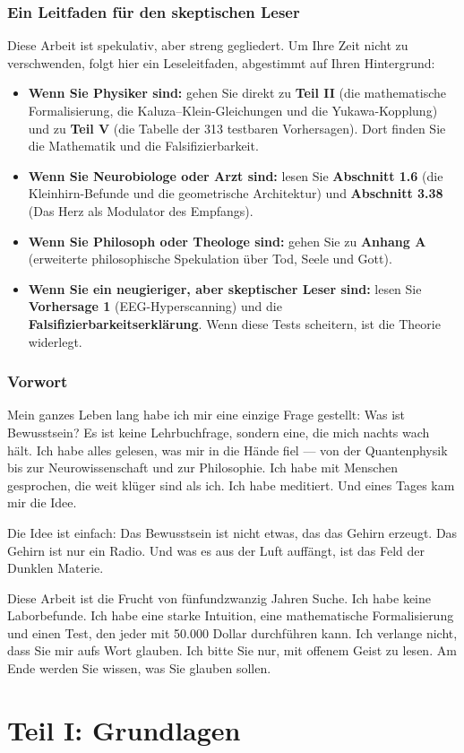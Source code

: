 \documentclass[11pt,a4paper]{article}
\begin{document}
\section*{Ein Leitfaden für den skeptischen Leser}
Diese Arbeit ist spekulativ, aber streng gegliedert. Um Ihre Zeit nicht zu verschwenden, folgt hier ein Leseleitfaden, abgestimmt auf Ihren Hintergrund:
\begin{itemize}
    \item \textbf{Wenn Sie Physiker sind:} gehen Sie direkt zu \textbf{Teil II} (die mathematische Formalisierung, die Kaluza--Klein-Gleichungen und die Yukawa-Kopplung) und zu \textbf{Teil V} (die Tabelle der 313 testbaren Vorhersagen). Dort finden Sie die Mathematik und die Falsifizierbarkeit.
    \item \textbf{Wenn Sie Neurobiologe oder Arzt sind:} lesen Sie \textbf{Abschnitt 1.6} (die Kleinhirn-Befunde und die geometrische Architektur) und \textbf{Abschnitt 3.38} (Das Herz als Modulator des Empfangs).
    \item \textbf{Wenn Sie Philosoph oder Theologe sind:} gehen Sie zu \textbf{Anhang A} (erweiterte philosophische Spekulation über Tod, Seele und Gott).
    \item \textbf{Wenn Sie ein neugieriger, aber skeptischer Leser sind:} lesen Sie \textbf{Vorhersage 1} (EEG-Hyperscanning) und die \textbf{Falsifizierbarkeitserklärung}. Wenn diese Tests scheitern, ist die Theorie widerlegt.
\end{itemize}

\section*{Vorwort}
Mein ganzes Leben lang habe ich mir eine einzige Frage gestellt: Was ist Bewusstsein? Es ist keine Lehrbuchfrage, sondern eine, die mich nachts wach hält. Ich habe alles gelesen, was mir in die Hände fiel --- von der Quantenphysik bis zur Neurowissenschaft und zur Philosophie. Ich habe mit Menschen gesprochen, die weit klüger sind als ich. Ich habe meditiert. Und eines Tages kam mir die Idee.

Die Idee ist einfach: Das Bewusstsein ist nicht etwas, das das Gehirn erzeugt. Das Gehirn ist nur ein Radio. Und was es aus der Luft auffängt, ist das Feld der Dunklen Materie.

Diese Arbeit ist die Frucht von fünfundzwanzig Jahren Suche. Ich habe keine Laborbefunde. Ich habe eine starke Intuition, eine mathematische Formalisierung und einen Test, den jeder mit 50.000 Dollar durchführen kann. Ich verlange nicht, dass Sie mir aufs Wort glauben. Ich bitte Sie nur, mit offenem Geist zu lesen. Am Ende werden Sie wissen, was Sie glauben sollen.

\newpage
\part*{Teil I: Grundlagen}
\end{document}
